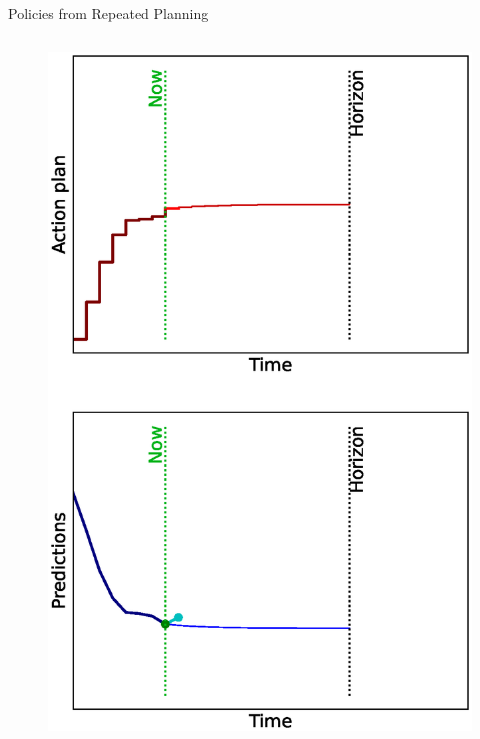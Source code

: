 \documentclass[lecture]{beamer}
\begin{document}
\begin{frame}{\normalsize Policies from Repeated Planning}
\begin{columns}
\begin{overlayarea}{\textwidth}{0.9\textheight}
\begin{figure}
{         \includegraphics[width=\FS\textwidth,clip]{Codes/MPC/MPC7.eps}
        }%
        \end{figure}
  \end{overlayarea}
        



\end{columns}
\end{frame}
\end{document}
